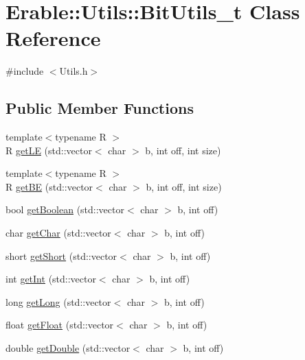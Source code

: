 \hypertarget{class_erable_1_1_utils_1_1_bit_utils__t}{}\section{Erable\+::Utils\+::Bit\+Utils\+\_\+t Class Reference}
\label{class_erable_1_1_utils_1_1_bit_utils__t}


{\ttfamily \#include $<$Utils.\+h$>$}

\subsection*{Public Member Functions}
\begin{DoxyCompactItemize}
\item 
{\footnotesize template$<$typename R $>$ }\\R \mbox{\hyperlink{class_erable_1_1_utils_1_1_bit_utils__t_afe67059642137257a2e7aff5abe10a10}{get\+LE}} (std\+::vector$<$ char $>$ b, int off, int size)
\item 
{\footnotesize template$<$typename R $>$ }\\R \mbox{\hyperlink{class_erable_1_1_utils_1_1_bit_utils__t_ab21dd6b10b95958f5736cd1a1e5546f1}{get\+BE}} (std\+::vector$<$ char $>$ b, int off, int size)
\item 
bool \mbox{\hyperlink{class_erable_1_1_utils_1_1_bit_utils__t_a60259969b4d603a302fd1afd9a43b465}{get\+Boolean}} (std\+::vector$<$ char $>$ b, int off)
\item 
char \mbox{\hyperlink{class_erable_1_1_utils_1_1_bit_utils__t_a6ca36d1d38e3929f84cc48393cff4366}{get\+Char}} (std\+::vector$<$ char $>$ b, int off)
\item 
short \mbox{\hyperlink{class_erable_1_1_utils_1_1_bit_utils__t_adec90f50d80b37545da2470dcf026bfe}{get\+Short}} (std\+::vector$<$ char $>$ b, int off)
\item 
int \mbox{\hyperlink{class_erable_1_1_utils_1_1_bit_utils__t_ac170aa684ca7d98a3f09e7f0509ae013}{get\+Int}} (std\+::vector$<$ char $>$ b, int off)
\item 
long \mbox{\hyperlink{class_erable_1_1_utils_1_1_bit_utils__t_a9ce6b8feb53b98249c94b775047bf628}{get\+Long}} (std\+::vector$<$ char $>$ b, int off)
\item 
float \mbox{\hyperlink{class_erable_1_1_utils_1_1_bit_utils__t_ac2b25328cbf57f2721d13b1412c3642b}{get\+Float}} (std\+::vector$<$ char $>$ b, int off)
\item 
double \mbox{\hyperlink{class_erable_1_1_utils_1_1_bit_utils__t_aa402b5136a5819451891e8d55b8b8d2d}{get\+Double}} (std\+::vector$<$ char $>$ b, int off)
\end{DoxyCompactItemize}



